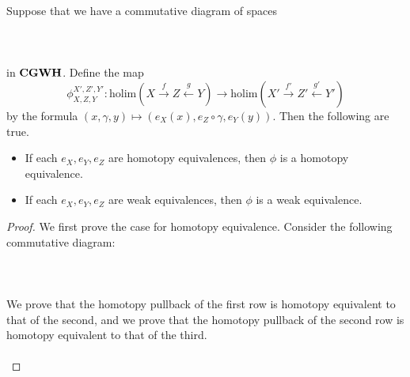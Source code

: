\documentclass[a4paper]{article}
\begin{document}
\begin{thm}{}{} Suppose that we have a commutative diagram of spaces \\~\\
\\~\\
in $\bold{CGWH}$. Define the map $$\phi_{X,Z,Y}^{X',Z',Y'}:\text{holim}(X\overset{f}{\rightarrow}Z\overset{g}{\leftarrow}Y)\to\text{holim}(X'\overset{f'}{\rightarrow}Z'\overset{g'}{\leftarrow}Y')$$ by the formula $(x,\gamma,y)\mapsto(e_X(x),e_Z\circ\gamma,e_Y(y))$. Then the following are true. 
\begin{itemize}
\item If each $e_X,e_Y,e_Z$ are homotopy equivalences, then $\phi$ is a homotopy equivalence. 
\item If each $e_X,e_Y,e_Z$ are weak equivalences, then $\phi$ is a weak equivalence. 
\end{itemize} \tcbline
\begin{proof}
We first prove the case for homotopy equivalence. Consider the following commutative diagram: \\~\\
\\~\\
We prove that the homotopy pullback of the first row is homotopy equivalent to that of the second, and we prove that the homotopy pullback of the second row is homotopy equivalent to that of the third. \\~\\


\end{proof}
\end{thm}
\end{document}
